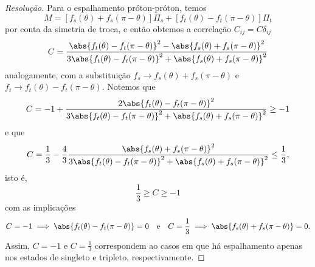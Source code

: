 \begin{proof}[Resolução]
   Para o espalhamento próton-próton, temos
   \begin{equation*}
      M = \left[f_s(\theta) + f_s(\pi - \theta)\right] \Pi_s + \left[f_t(\theta) - f_t(\pi - \theta)\right]\Pi_t
   \end{equation*}
   por conta da simetria de troca, e então obtemos a correlação \(C_{ij} = C \delta_{ij}\)
   \begin{equation*}
      C = \frac{\abs{f_t(\theta) - f_t(\pi - \theta)}^2 - \abs{f_s(\theta) + f_s(\pi - \theta)}^2}{3\abs{f_t(\theta) - f_t(\pi - \theta)}^2 + \abs{f_s(\theta) + f_s(\pi - \theta)}^2}
   \end{equation*}
   analogamente, com a substituição \(f_s \to f_s(\theta) + f_s(\pi - \theta)\) e \(f_t \to f_t(\theta) - f_t(\pi - \theta)\). Notemos que
   \begin{equation*}
       C = -1 + \frac{2\abs{f_t(\theta) - f_t(\pi - \theta)}^2}{3\abs{f_t(\theta) - f_t(\pi - \theta)}^2 + \abs{f_s(\theta) + f_s(\pi - \theta)}^2} \geq -1
   \end{equation*}
   e que
   \begin{equation*}
       C = \frac13 - \frac43\frac{\abs{f_s(\theta) + f_s(\pi - \theta)}^2}{3\abs{f_t(\theta) - f_t(\pi - \theta)}^2 + \abs{f_s(\theta) + f_s(\pi - \theta)}^2} \leq \frac13,
   \end{equation*}
   isto é, 
   \begin{equation*}
      \frac13 \geq C \geq -1
   \end{equation*}
   com as implicações 
   \begin{equation*}
      C = -1 \implies \abs{f_t(\theta) - f_t(\pi-\theta)} = 0
      \quad\text{e}\quad
      C = \frac13 \implies \abs{f_s(\theta) + f_s(\pi-\theta)} = 0.
   \end{equation*}
   Assim, \(C = -1\) e \(C = \frac13\) correspondem ao casos em que há espalhamento apenas nos estados de singleto e tripleto, respectivamente. \todo[Exemplo.]
\end{proof}
